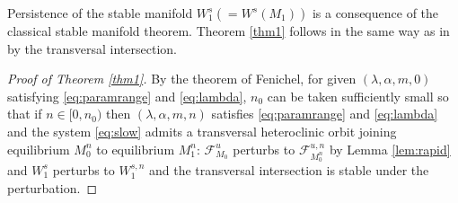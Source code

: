\documentclass[11pt]{article}
\theoremstyle{remark}
\begin{document}
Persistence of the stable manifold $W_1^s (= W^s(M_1))$ is a consequence of the classical stable manifold theorem. Theorem \ref{thm1} follows in the same way as in \cite[Theorem 3.1]{Sz1991} by the transversal intersection.

\begin{proof}[Proof of Theorem \ref{thm1}]
 By the theorem of Fenichel, for given $(\lambda,\alpha,m,0)$ satisfying \eqref{eq:paramrange} and \eqref{eq:lambda}, $n_0$ can be taken sufficiently small so that  if $n \in [0, n_0)$ then $(\lambda,\alpha,m,n)$ satisfies \eqref{eq:paramrange} and \eqref{eq:lambda} and  the system  \eqref{eq:slow} admits a transversal heteroclinic orbit joining equilibrium $M_0^{n}$ to equilibrium $M_1^{n}$: $\mathcal{F}^u_{M_0}$ perturbs to $\mathcal{F}^{u,n}_{M_0^n}$ by Lemma \ref{lem:rapid} and $W_1^s$ perturbs to $W_1^{s,n}$ and the transversal intersection is stable under the perturbation.
\end{proof}
\end{document}
